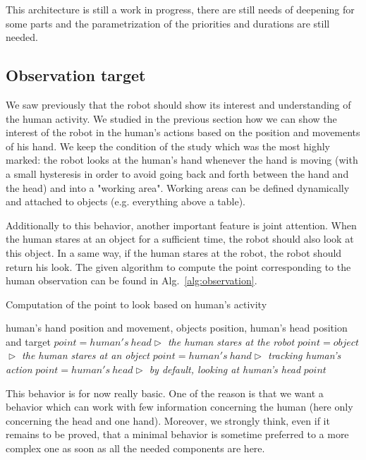 \documentclass[english,a4paper,11pt,twoside]{StyleThese}
\begin{document}
This architecture is still a work in progress, there are still needs of deepening for some parts and the parametrization of the priorities and durations are still needed.

\subsection{Observation target}

We saw previously that the robot should show its interest and understanding of the human activity. We studied in the previous section how we can show the interest of the robot in the human's actions based on the position and movements of his hand. We keep the condition of the study which was the most highly marked: the robot looks at the human's hand whenever the hand is moving (with a small hysteresis in order to avoid going back and forth between the hand and the head) and into a "working area". Working areas can be defined dynamically and attached to objects (e.g. everything above a table).

Additionally to this behavior, another important feature is joint attention. When the human stares at an object for a sufficient time, the robot should also look at this object. In a same way, if the human stares at the robot, the robot should return his look. The given algorithm to compute the point corresponding to the human observation can be found in Alg.~\ref{alg:observation}.


\begin{algorithm}
\caption{Computation of the point to look based on human's activity}
\label{alg:observation}
\begin{algorithmic}
\REQUIRE human's hand position and movement, objects position, human's  head position and target
\STATE $point = human's \ head$\hfill \textit{$\vartriangleright$ the human stares at the robot}
\STATE $point = object$\hfill \textit{$\vartriangleright$ the human stares at an object}
\STATE $point = human's \ hand$\hfill \textit{$\vartriangleright$ tracking human's action}
\ELSE
\STATE $point = human's \ head$\hfill \textit{$\vartriangleright$ by default, looking at human's head}
\ENDIF
\RETURN $point$
\end{algorithmic}
\end{algorithm}

This behavior is for now really basic. One of the reason is that we want a behavior which can work with few information concerning the human (here only concerning the head and one hand). Moreover, we strongly think, even if it remains to be proved, that a minimal behavior is sometime preferred to a more complex one as soon as all the needed components are here.
\end{document}
